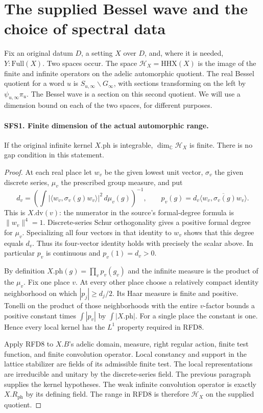 \section{The supplied Bessel wave and the choice of spectral data}

Fix an original datum $D$, a setting $X$ over $D$, and, where it is
needed, $Y:\mathrm{Full}(X)$. Two spaces occur. The space
$\mathcal H_X=\mathrm{HHX}(X)$ is the image of the finite and infinite
operators on the adelic automorphic quotient. The real Bessel quotient
for a word $u$ is $S_{u,\infty}\backslash G_\infty$, with sections
transforming on the left by $\psi_{u,\infty}\pi_u$. The Bessel wave
is a section on this second quotient. We will use a dimension bound
on each of the two spaces, for different purposes.

\paragraph{SFS1. Finite dimension of the actual automorphic range.}
\label{claim:SFS1}
If the original infinite kernel $X.\mathrm{ph}$ is integrable,
$\dim_{\mathbb C}\mathcal H_X$ is finite. There is no gap condition
in this statement.

\begin{proof}
At each real place let $w_v$ be the given lowest unit vector,
$\sigma_v$ the given discrete series, $\mu_v$ the prescribed
group measure, and put
\[
 d_v=\left(\int|\langle w_v,\sigma_v(g)w_v\rangle|^2\,d\mu_v(g)
       \right)^{-1},\qquad
 p_v(g)=d_v\overline{\langle w_v,\sigma_v(g)w_v\rangle}.
\]
This is $X.\mathrm{dv}(v)$: the numerator in the source's
formal-degree formula is $\|w_v\|^4=1$. Discrete-series Schur
orthogonality gives a positive formal degree for $\mu_v$.
Specializing all four vectors in that identity to $w_v$ shows
that this degree equals $d_v$. Thus its four-vector identity holds
with precisely the scalar above. In particular $p_v$ is continuous
and $p_v(1)=d_v>0$.

By definition $X.\mathrm{ph}(g)=\prod_v p_v(g_v)$ and the
infinite measure is the product of the $\mu_v$. Fix one place $v$.
At every other place choose a relatively compact identity
neighborhood on which $|p_j|\ge d_j/2$.
Its Haar measure is finite and positive. Tonelli on the product
of those neighborhoods with the entire $v$-factor bounds a
positive constant times $\int |p_v|$ by $\int |X.\mathrm{ph}|$.
For a single place the constant is one. Hence every local kernel
has the $L^1$ property required in RFD8.

Apply RFD8 to $X.B$'s adelic domain, measure, right regular action,
finite test function, and finite convolution operator. Local
constancy and support in the lattice stabilizer are fields of its
admissible finite test. The local representations are irreducible
and unitary by the discrete-series field. The previous paragraph
supplies the kernel hypotheses. The weak infinite convolution
operator is exactly $X.R_{\mathrm{ph}}$ by its defining field.
The range in RFD8 is therefore $\mathcal H_X$ on the supplied quotient.
\end{proof}

